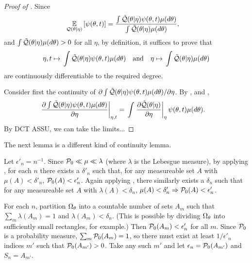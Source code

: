 %
\begin{proof}[Proof of ]
%
Since
%
\begin{align*}
%
\expect{\q(\theta \vert \eta)}{\psi(\theta, \t)} ={}&
\frac{\int \qtil(\theta \vert \eta) \psi(\theta, \t) \mu(d\theta)}
     {\int \qtil(\theta \vert \eta) \mu(d\theta)},
%
\end{align*}
%
and $\int \tilde{\mathcal{Q}}(\theta \vert \eta) \mu(d\theta) > 0$ for all $\eta$,
by definition, it suffices to prove that
%
\begin{align*}
%
\eta, \t \mapsto{}
    \int \qtil(\theta \vert \eta) \psi(\theta, \t) \mu(d\theta) \mathand
\eta \mapsto{}
    \int \qtil(\theta \vert \eta) \mu(d\theta)
%
\end{align*}
%
are continuously differentiable to the required degree.

Consider first the continuity of $\partial \int \tilde{\mathcal{Q}}(\theta \vert \eta)
\psi(\theta, t) \mu(d\theta) / \partial \eta$.  By ,
and ,
%
\begin{align*}
%
\fracat{\partial \int \qtil(\theta \vert \eta) \psi(\theta, \t) \mu(d\theta) }
       {\partial \eta}{\eta, \t} ={}&
\int \fracat{\partial \qtil(\theta \vert \eta) }
      {\partial \eta}{\eta}  \psi(\theta, \t) \mu(d\theta).
%
\end{align*}
%
By DCT ASSU, we can take the limits...
%
\end{proof}
%




The next lemma is a different kind of continuity lemma.


\begin{lem}
%
Let $\epsilon'_n = n^{-1}$.  Since $\mathcal{P}_{0} \ll \mu \ll \lambda$ (where $\lambda$
is the Lebesgue measure), by applying \citet[Proposition
15.5]{nielsen:1997:measure}, for each $n$ there exists a $\delta'_n$ such that,
for any measureable set $A$ with $\mu(A) < \delta'_n$, $\mathcal{P}_{0}(A) <
\epsilon'_n$.  Again applying \citet[Proposition 15.5]{nielsen:1997:measure},
there similarly exists a $\delta_n$ such that for any measureable set $A$ with
$\lambda(A) < \delta_n$, $\mu(A) < \delta'_n \Rightarrow \mathcal{P}_{0}(A) <
\epsilon'_n$.

For each $n$, partition $\Omega_{\theta}$ into a countable number of sets $A_{m}$ such
that $\sum_{m} \lambda(A_{m}) = 1$ and $\lambda(A_{m}) < \delta_n$. (This is
possible by dividing $\Omega_{\theta}$ into sufficiently small rectangles, for
example.)  Then $\mathcal{P}_{0}(A_{m}) < \epsilon'_n$ for all $m$.  Since $\mathcal{P}_{0}$ is a
probability measure, $\sum_m \mathcal{P}_{0}(A_{m}) = 1$, so there must exist at least $1 /
\epsilon'_n$ indices $m'$ such that $\mathcal{P}_{0}(A_{m'}) > 0$. Take any such $m'$ and
let $\epsilon_n = \mathcal{P}_{0}(A_{m'})$ and $S_n = A_{m'}$.

%
\end{lem}
